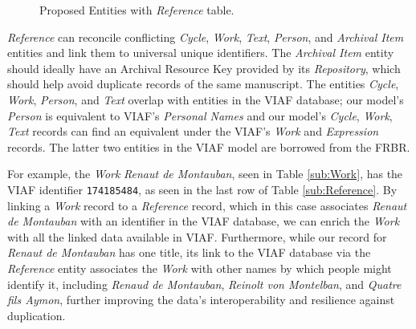 \begin{figure}[htb!]
    \begin{center}
        
    \end{center}
\caption{Proposed Entities with \textit{Reference} table.}
\label{fig:ProposedEntitiesReference}
\end{figure}

\textit{Reference} can reconcile conflicting \textit{Cycle}, \textit{Work}, \textit{Text}, \textit{Person}, and \textit{Archival Item} entities and link them to universal unique identifiers. The \textit{Archival Item} entity should ideally have an Archival Resource Key provided by its \textit{Repository}, which should help avoid duplicate records of the same manuscript. The entities \textit{Cycle}, \textit{Work}, \textit{Person}, and \textit{Text} overlap with entities in the VIAF database; our model's \textit{Person} is equivalent to VIAF's \textit{Personal Names} and our model's \textit{Cycle}, \textit{Work}, \textit{Text} records can find an equivalent under the VIAF's \textit{Work} and \textit{Expression} records. The latter two entities in the VIAF model are borrowed from the FRBR.

For example, the \textit{Work} \textit{Renaut de Montauban}, seen in Table \ref{sub:Work}, has the VIAF identifier {\texttt{174185484}}, as seen in the last row of Table \ref{sub:Reference}. By linking a \textit{Work} record to a \textit{Reference} record, which in this case associates \textit{Renaut de Montauban} with an identifier in the VIAF database, we can enrich the \textit{Work} with all the linked data available in VIAF. Furthermore, while our record for \textit{Renaut de Montauban} has one title, its link to the VIAF database via the \textit{Reference} entity associates the \textit{Work} with other names by which people might identify it, including \textit{Renaud de Montauban}, \textit{Reinolt von Montelban}, and \textit{Quatre fils Aymon}, further improving the data's interoperability and resilience against duplication.

